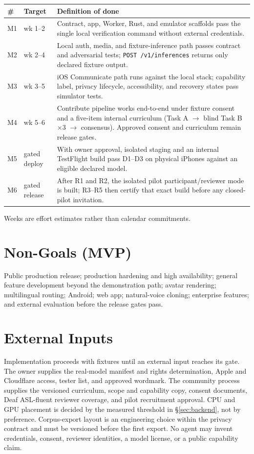 \documentclass[11pt]{article}
\begin{document}
\begin{center}
\begin{tabular}{@{}llp{7.6cm}@{}}
\toprule
\# & Target & Definition of done \\
\midrule
M1 & wk 1--2 & Contract, app, Worker, Rust, and emulator scaffolds pass the single local
verification command without external credentials. \\
M2 & wk 2--4 & Local auth, media, and fixture-inference path passes contract and
adversarial tests; \texttt{POST /v1/inferences} returns only declared fixture output. \\
M3 & wk 3--5 & iOS Communicate path runs against the local stack; capability label,
privacy lifecycle, accessibility, and recovery states pass simulator tests. \\
M4 & wk 5--6 & Contribute pipeline works end-to-end under fixture consent and a
five-item internal curriculum (Task A $\to$ blind Task B $\times$3 $\to$ consensus).
Approved consent and curriculum remain release gates. \\
M5 & gated deploy & With owner approval, isolated staging and an internal TestFlight
build pass D1--D3 on physical iPhones against an eligible declared model. \\
M6 & gated release & After R1 and R2, the isolated pilot participant/reviewer mode is
built; R3--R5 then certify that exact build before any closed-pilot invitation. \\
\bottomrule
\end{tabular}
\end{center}

Weeks are effort estimates rather than calendar commitments.

\section{Non-Goals (MVP)}

Public production release; production hardening and high availability; general
feature development beyond the demonstration path; avatar rendering; multilingual
routing; Android; web app; natural-voice cloning; enterprise features; and external
evaluation before the release gates pass.

\section{External Inputs}

Implementation proceeds with fixtures until an external input reaches its gate. The
owner supplies the real-model manifest and rights determination, Apple and Cloudflare
access, tester list, and approved wordmark. The community process supplies the
versioned curriculum, scope and capability copy, consent documents, Deaf ASL-fluent
reviewer coverage, and pilot recruitment approval. CPU and GPU placement is decided by
the measured threshold in \S\ref{sec:backend}, not by preference. Corpus-export layout
is an engineering choice within the privacy contract and must be versioned before the
first export. No agent may invent credentials, consent, reviewer identities, a model
license, or a public capability claim.
\end{document}
